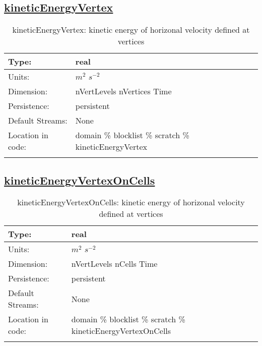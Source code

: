 \subsection[kineticEnergyVertex]{\hyperref[sec:var_tab_scratch]{kineticEnergyVertex}}
\label{subsec:var_sec_scratch_kineticEnergyVertex}
\begin{center}
\begin{longtable}{| p{2.0in} | p{4.0in} |}
        \hline 
        Type: & real \\
        \hline 
        Units: & $m^2$ $s^{-2}$ \\
        \hline 
        Dimension: & nVertLevels nVertices Time \\
        \hline 
        Persistence: & persistent \\
        \hline 
		 Default Streams: & None \\
        \hline 
		 Location in code: & domain \% blocklist \% scratch \% kineticEnergyVertex \\
		 \hline 
    \caption{kineticEnergyVertex: kinetic energy of horizonal velocity defined at vertices}
\end{longtable}
\end{center}
\subsection[kineticEnergyVertexOnCells]{\hyperref[sec:var_tab_scratch]{kineticEnergyVertexOnCells}}
\label{subsec:var_sec_scratch_kineticEnergyVertexOnCells}
\begin{center}
\begin{longtable}{| p{2.0in} | p{4.0in} |}
        \hline 
        Type: & real \\
        \hline 
        Units: & $m^2$ $s^{-2}$ \\
        \hline 
        Dimension: & nVertLevels nCells Time \\
        \hline 
        Persistence: & persistent \\
        \hline 
		 Default Streams: & None \\
        \hline 
		 Location in code: & domain \% blocklist \% scratch \% kineticEnergyVertexOnCells \\
		 \hline 
    \caption{kineticEnergyVertexOnCells: kinetic energy of horizonal velocity defined at vertices}
\end{longtable}
\end{center}
